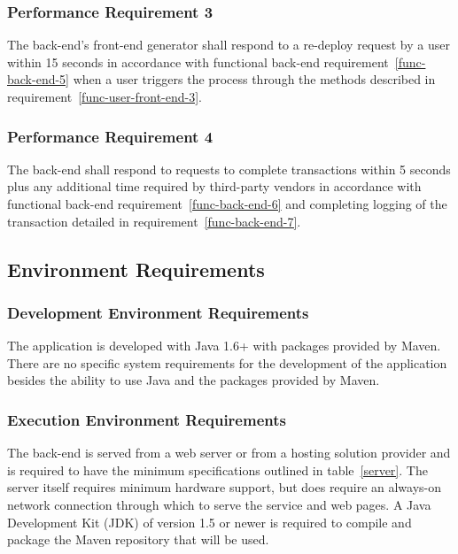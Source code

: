 \documentclass{article}
\begin{document}
\subsubsection{Performance Requirement 3}
\label{perf-back-end-3}

The back-end's front-end generator shall respond to a re-deploy request by a
user within 15 seconds in accordance with functional back-end
requirement~\ref{func-back-end-5} when a user triggers the process through the
methods described in requirement~\ref{func-user-front-end-3}.

\subsubsection{Performance Requirement 4}
\label{perf-back-end-4}

The back-end shall respond to requests to complete transactions within 5 seconds
plus any additional time required by third-party vendors in accordance with
functional back-end requirement~\ref{func-back-end-6} and completing logging of
the transaction detailed in requirement~\ref{func-back-end-7}.

\pagebreak
\subsection{Environment Requirements}

\subsubsection{Development Environment Requirements}

The application is developed with Java 1.6+ with packages provided by
Maven.  There are no specific system requirements for the development of
the application besides the ability to use Java and the packages provided
by Maven.

\subsubsection{Execution Environment Requirements}

The back-end is served from a web server or from a hosting solution provider and is
required to have the minimum specifications outlined in table~\ref{server}.  The
server itself requires minimum hardware support, but does require an always-on
network connection through which to serve the service and web pages.  A Java
Development Kit (JDK) of version 1.5 or newer is required to compile and package
the Maven repository that will be used.
\end{document}
